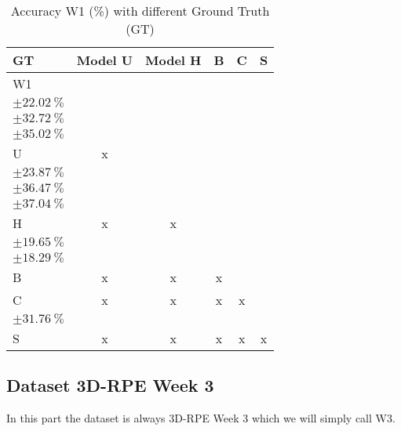 \begin{table}[H]
\small
\centering
\caption{\label{tab:base3dRPEdatamask}%
  Accuracy W1 (\%) with different Ground Truth (GT)
}
\begin{tabular}{lccccc}
  \toprule
  GT & Model U & Model H & B & C & S \\
  \midrule
  W1 &  & \makecell{$\SI{25.05}{\percent}$ \\ $\pm \SI{22.02}{\percent}$} &  & \makecell{$\SI{50.78}{\percent}$ \\ $\pm \SI{32.72}{\percent}$} & \makecell{$\SI{38.16}{\percent}$ \\ $\pm \SI{35.02}{\percent}$} \\
  U & x & \makecell{$\SI{25.57}{\percent}$ \\ $\pm \SI{23.87}{\percent}$} &  & \makecell{$\SI{49.61}{\percent}$ \\ $\pm \SI{36.47}{\percent}$} & \makecell{$\SI{38.73}{\percent}$ \\ $\pm \SI{37.04}{\percent}$} \\
  H & x & x &                                                                & \makecell{$\SI{41.98}{\percent}$ \\ $\pm \SI{19.65}{\percent}$} & \makecell{$\SI{82.51}{\percent}$ \\ $\pm \SI{18.29}{\percent}$} \\
  B & x & x & x &  &  \\
  C & x & x & x & x                                                                                                                            & \makecell{$\SI{54.47}{\percent}$ \\ $\pm \SI{31.76}{\percent}$} \\
  S & x & x & x & x & x \\
  \bottomrule
\end{tabular}
\end{table}

\subsection{Dataset 3D-RPE Week 3}


In this part the dataset is always 3D-RPE Week 3 which we will simply call W3.

